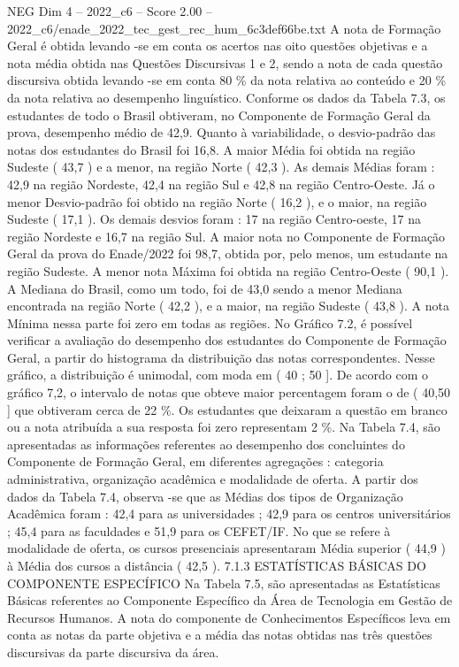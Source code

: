 \begin{textsample}{NEG Dim 4 – 2022\_c6 – Score 2.00 – 2022\_c6/enade\_2022\_tec\_gest\_rec\_hum\_6c3def66be.txt}
A nota de Formação Geral é obtida levando -se em conta os acertos nas oito questões objetivas e a nota média obtida nas Questões Discursivas 1 e 2, sendo a nota de cada questão discursiva obtida levando -se em conta 80 \% da nota relativa ao conteúdo e 20 \% da nota relativa ao desempenho linguístico.
Conforme os dados da Tabela 7.3, os estudantes de todo o Brasil obtiveram, no Componente de Formação Geral da prova, desempenho médio de 42,9.
Quanto à variabilidade, o desvio-padrão das notas dos estudantes do Brasil foi 16,8.
A maior Média foi obtida na região Sudeste ( 43,7 ) e a menor, na região Norte ( 42,3 ).
As demais Médias foram : 42,9 na região Nordeste, 42,4 na região Sul e 42,8 na região Centro-Oeste.
Já o menor Desvio-padrão foi obtido na região Norte ( 16,2 ), e o maior, na região Sudeste ( 17,1 ).
Os demais desvios foram : 17 na região Centro-oeste, 17 na região Nordeste e 16,7 na região Sul.
A maior nota no Componente de Formação Geral da prova do Enade/2022 foi 98,7, obtida por, pelo menos, um estudante na região Sudeste.
A menor nota Máxima foi obtida na região Centro-Oeste ( 90,1 ).
A Mediana do Brasil, como um todo, foi de 43,0 sendo a menor Mediana encontrada na região Norte ( 42,2 ), e a maior, na região Sudeste ( 43,8 ).
A nota Mínima nessa parte foi zero em todas as regiões.
No Gráfico 7.2, é possível verificar a avaliação do desempenho dos estudantes do Componente de Formação Geral, a partir do histograma da distribuição das notas correspondentes.
Nesse gráfico, a distribuição é unimodal, com moda em ( 40 ; 50 ].
De acordo com o gráfico 7,2, o intervalo de notas que obteve maior percentagem foram o de ( 40,50 ] que obtiveram cerca de 22 \%.
Os estudantes que deixaram a questão em branco ou a nota atribuída a sua resposta foi zero representam 2 \%.
Na Tabela 7.4, são apresentadas as informações referentes ao desempenho dos concluintes do Componente de Formação Geral, em diferentes agregações : categoria administrativa, organização acadêmica e modalidade de oferta.
A partir dos dados da Tabela 7.4, observa -se que as Médias dos tipos de Organização Acadêmica foram : 42,4 para as universidades ; 42,9 para os centros universitários ; 45,4 para as faculdades e 51,9 para os CEFET/IF.
No que se refere à modalidade de oferta, os cursos presenciais apresentaram Média superior ( 44,9 ) à Média dos cursos a distância ( 42,5 ). 7.1.3 ESTATÍSTICAS BÁSICAS DO COMPONENTE ESPECÍFICO Na Tabela 7.5, são apresentadas as Estatísticas Básicas referentes ao Componente Específico da Área de Tecnologia em Gestão de Recursos Humanos.
A nota do componente de Conhecimentos Específicos leva em conta as notas da parte objetiva e a média das notas obtidas nas três questões discursivas da parte discursiva da área.

\end{textsample}
